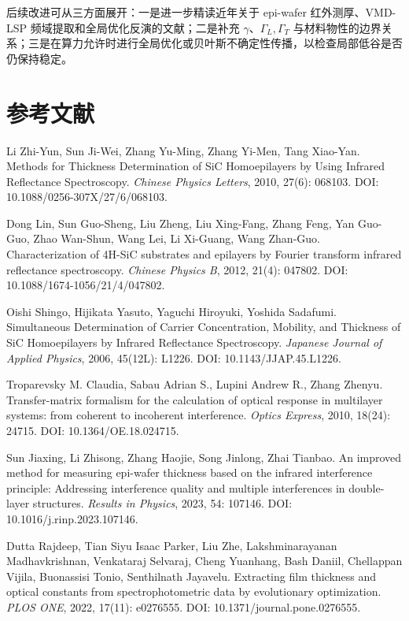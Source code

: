 \documentclass[UTF8,a4paper,12pt]{ctexart}
\begin{document}
后续改进可从三方面展开：一是进一步精读近年关于 epi-wafer 红外测厚、VMD-LSP 频域提取和全局优化反演的文献；二是补充 $\gamma$、$\Gamma_L,\Gamma_T$ 与材料物性的边界关系；三是在算力允许时进行全局优化或贝叶斯不确定性传播，以检查局部低谷是否仍保持稳定。

\section{参考文献}

\begin{enumerate}[label={[\arabic*]}]
  \item Li Zhi-Yun, Sun Ji-Wei, Zhang Yu-Ming, Zhang Yi-Men, Tang Xiao-Yan. Methods for Thickness Determination of SiC Homoepilayers by Using Infrared Reflectance Spectroscopy. \textit{Chinese Physics Letters}, 2010, 27(6): 068103. DOI: 10.1088/0256-307X/27/6/068103.
  \item Dong Lin, Sun Guo-Sheng, Liu Zheng, Liu Xing-Fang, Zhang Feng, Yan Guo-Guo, Zhao Wan-Shun, Wang Lei, Li Xi-Guang, Wang Zhan-Guo. Characterization of 4H-SiC substrates and epilayers by Fourier transform infrared reflectance spectroscopy. \textit{Chinese Physics B}, 2012, 21(4): 047802. DOI: 10.1088/1674-1056/21/4/047802.
  \item Oishi Shingo, Hijikata Yasuto, Yaguchi Hiroyuki, Yoshida Sadafumi. Simultaneous Determination of Carrier Concentration, Mobility, and Thickness of SiC Homoepilayers by Infrared Reflectance Spectroscopy. \textit{Japanese Journal of Applied Physics}, 2006, 45(12L): L1226. DOI: 10.1143/JJAP.45.L1226.
  \item Troparevsky M. Claudia, Sabau Adrian S., Lupini Andrew R., Zhang Zhenyu. Transfer-matrix formalism for the calculation of optical response in multilayer systems: from coherent to incoherent interference. \textit{Optics Express}, 2010, 18(24): 24715. DOI: 10.1364/OE.18.024715.
  \item Sun Jiaxing, Li Zhisong, Zhang Haojie, Song Jinlong, Zhai Tianbao. An improved method for measuring epi-wafer thickness based on the infrared interference principle: Addressing interference quality and multiple interferences in double-layer structures. \textit{Results in Physics}, 2023, 54: 107146. DOI: 10.1016/j.rinp.2023.107146.
  \item Dutta Rajdeep, Tian Siyu Isaac Parker, Liu Zhe, Lakshminarayanan Madhavkrishnan, Venkataraj Selvaraj, Cheng Yuanhang, Bash Daniil, Chellappan Vijila, Buonassisi Tonio, Senthilnath Jayavelu. Extracting film thickness and optical constants from spectrophotometric data by evolutionary optimization. \textit{PLOS ONE}, 2022, 17(11): e0276555. DOI: 10.1371/journal.pone.0276555.

\end{enumerate}
\end{document}
